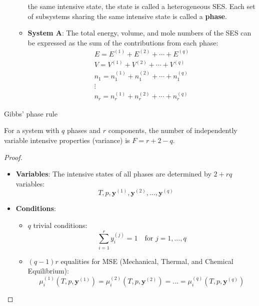 \begin{defn}
\begin{enumerate}
\begin{itemize}
         the same intensive state, the state is called a heterogeneous SES. Each set of subsystems sharing the same intensive state is called a \textbf{phase}.
        \item \textbf{System A}: The total energy, volume, and mole numbers of the SES can be expressed as the sum of the contributions from each phase:
\begin{gather*}
            E = E^{(1)} + E^{(2)} + \cdots + E^{(q)}
    \\
            V = V^{(1)} + V^{(2)} + \cdots + V^{(q)}
    \\
            n_1 = n_1^{(1)} + n_1^{(2)} + \cdots + n_1^{(q)}
    \\
            \vdots
    \\
            n_r = n_r^{(1)} + n_r^{(2)} + \cdots + n_r^{(q)}
\end{gather*}
    \end{itemize}
\end{enumerate}
\end{defn}
\begin{thm}
    Gibbs' phase rule 

    For a system with \( q \) phases and \( r \) components, 
    the number of independently variable intensive properties (variance) is \( F = r + 2 - q \).
    \begin{proof}
        \begin{itemize}
            \item \textbf{Variables}: The intensive states of all phases are determined by \textcolor{b1}{\( 2 + rq \)} variables:
            \[
            T, p, \mathbf{y}^{(1)}, \mathbf{y}^{(2)}, \ldots, \mathbf{y}^{(q)}
            \]
            \item \textbf{Conditions}:
            \begin{itemize}
                \item \textcolor{b1}{\( q \)} trivial conditions:
                \[
                \sum_{i=1}^{r} y_i^{(j)} = 1 \quad \text{for } j = 1, \ldots, q
                \]
                \item \textcolor{b1}{\( (q-1)r \)} equalities for MSE (Mechanical, Thermal, and Chemical Equilibrium):
                \[
                \mu_i^{(1)}(T, p, \mathbf{y}^{(1)}) = \mu_i^{(2)}(T, p, \mathbf{y}^{(2)}) = \ldots = \mu_i^{(q)}(T, p, \mathbf{y}^{(q)})
                \]
            \end{itemize}
        \end{itemize}
    \end{proof}
\end{thm}
